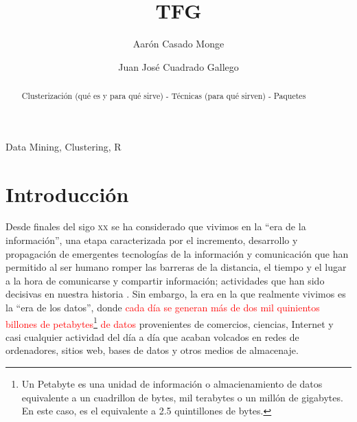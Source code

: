 \documentclass[3p,twocolumn]{elsarticle}
\begin{document}
\title{TFG} %

\author[1]{Aarón Casado Monge} %

\author[2]{Juan José Cuadrado Gallego} %

\address{University of Alcala, Polytechnic School, Computer Science Department, Scientific and Technological Campus, Politechnic Building. Office: O243, 28805, Alcala de Henares, Madrid, Spain}

\begin{abstract}
Clusterización (qué es y para qué sirve) - Técnicas (para qué sirven) - Paquetes 
\end{abstract}

\begin{keyword}
Data Mining, Clustering, R
\end{keyword}

\maketitle %
 
 

 
\section{Introducción}


Desde finales del sigo \textsc{xx} se ha considerado que vivimos en la ``era de la información'', una etapa caracterizada por el incremento, desarrollo y propagación de emergentes tecnologías de la información y comunicación que han permitido al ser humano romper las barreras de la distancia, el tiempo y el lugar a la hora de comunicarse y compartir información; actividades que han sido decisivas en nuestra historia \cite{1}. Sin embargo, la era en la que realmente vivimos es la ``era de los datos'', donde \textcolor{Red} {cada día se generan más de dos mil quinientos billones de petabytes\footnote {Un Petabyte es una unidad de información o almacienamiento de datos equivalente a un cuadrillon de bytes, mil terabytes o un millón de gigabytes. En este caso, es el equivalente a 2.5 quintillones de bytes.} de datos} provenientes de comercios, ciencias, Internet y casi cualquier actividad del día a día \cite{2} que acaban volcados en redes de ordenadores, sitios web, bases de datos y otros medios de almacenaje. 
\end{document}
